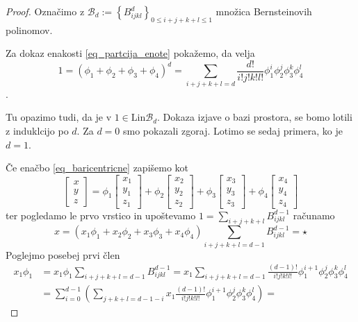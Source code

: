 \documentclass[11pt,a4paper]{article}
\begin{document}
\begin{proof}
    Označimo z $\mathcal{B}_d := \left\{ B_{ijkl}^d  \right\}_{0\leq i+j+k+l \leq 1}$ množica
    Bernsteinovih polinomov. 

    Za dokaz enakosti \eqref{eq_partcija_enote} pokažemo, da velja $$1 = \left( \phi_1 + \phi_2 + 
    \phi_3 + \phi_4  \right)^d = \sum_{i+j+k+l = d} \frac{d!}{i!j!k!l!} 
    \phi_1^i \phi_2^j \phi_3^k \phi_4^l$$.

    Tu opazimo tudi, da je v $1 \in \text{Lin} \mathcal{B}_d$. Dokaza izjave
    o bazi prostora, se bomo lotili z induklcijo po $d$. Za $d = 0$ smo pokazali zgoraj. Lotimo
    se sedaj primera, ko je $d = 1$.

    Če enačbo \eqref{eq_baricentricne} zapišemo kot 
    \begin{equation*}
        \begin{bmatrix}
            x \\ y \\ z 
        \end{bmatrix} = 
        \phi_1\begin{bmatrix} x_1 \\ y_1 \\ z_1\end{bmatrix} +
        \phi_2\begin{bmatrix} x_2 \\ y_2 \\ z_2\end{bmatrix} +  
        \phi_3\begin{bmatrix} x_3 \\ y_3 \\ z_3\end{bmatrix} +
        \phi_4\begin{bmatrix} x_4 \\ y_4 \\ z_4\end{bmatrix}
    \end{equation*}
    ter pogledamo le prvo vrstico in upoštevamo $1 = \sum_{i+j+k+l}B_{ijkl}^{d-1}$ računamo
    $$x = \left(x_1 \phi_1 + x_2 \phi_2 + x_3 \phi_3 +x_4 \phi_4 \right)  \sum_{i+j+k+l = d-1} B_{ijkl}^{d-1} = \star $$
    Poglejmo posebej prvi člen
    \begin{align*}
        x_1 \phi_1 &= x_1 \phi_1 \sum_{i+j+k+l = d-1} B_{ijkl}^{d-1} =  
            x_1  \sum_{i+j+k+l = d-1} \frac{(d-1)!}{i!j!k!l!} \phi_1^{i+1} \phi_2^j \phi_3^k \phi_4^l 
            \\ & = \sum_{i = 0}^{d-1} \left(\sum_{j+k+l = d-1-i} x_1 \frac{(d-1)!}{i!j!k!l!} \phi_1^{i+1} \phi_2^j \phi_3^k \phi_4^l \right) = 

\end{align*}
\end{proof}
\end{document}
